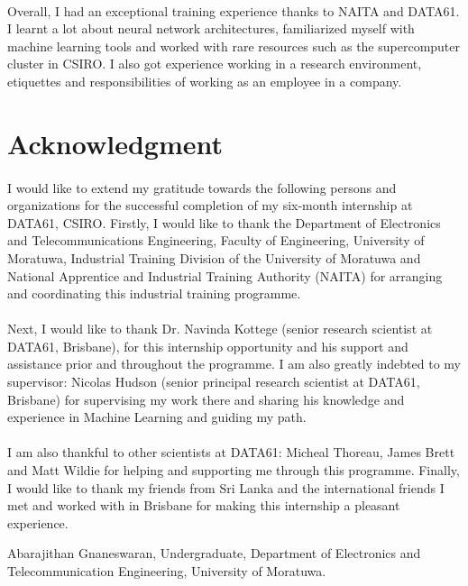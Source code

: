 \paragraph{}
Overall, I had an exceptional training experience thanks to NAITA and DATA61. I learnt a lot about neural network architectures, familiarized myself with machine learning tools and worked with rare resources such as the supercomputer cluster in CSIRO. I also got experience working in a research environment, etiquettes and responsibilities of working as an employee in a company. 

\newpage
\section*{Acknowledgment}

\paragraph{}
I would like to extend my gratitude towards the following persons and organizations for the successful completion of my six-month internship at DATA61, CSIRO. Firstly, I would like to thank the Department of Electronics and Telecommunications Engineering, Faculty of Engineering, University of Moratuwa, Industrial Training
Division of the University of Moratuwa and National Apprentice and Industrial Training Authority (NAITA) for
arranging and coordinating this industrial training programme. 

\paragraph{}
Next, I would like to thank Dr. Navinda Kottege (senior research scientist at DATA61, Brisbane), for this internship opportunity and his support and assistance prior and throughout the programme. I am also greatly indebted to my supervisor: Nicolas Hudson (senior principal research scientist at DATA61, Brisbane) for supervising my work there and sharing his knowledge and experience in Machine Learning and guiding my path.

\paragraph{}
I am also thankful to other scientists at DATA61: Micheal Thoreau, James Brett and Matt Wildie for helping and supporting me through this programme. Finally, I would like to thank my friends from Sri Lanka and the international friends I met and worked with in Brisbane for making this internship a pleasant experience.

\vspace*{3cm}

\noindent Abarajithan Gnaneswaran,\newline
Undergraduate,\newline
Department of Electronics and Telecommunication Engineering,\newline
University of Moratuwa.